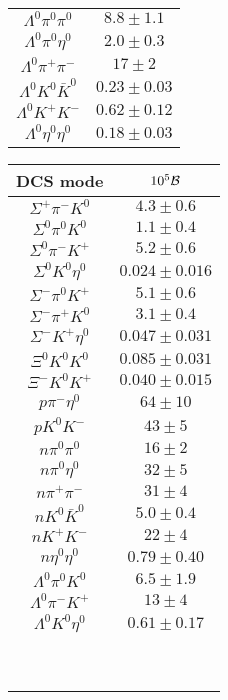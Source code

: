 \begin{table}
{\begin{tabular}{|c|c|}
		$\Lambda^{0} \pi^{0} \pi^{0} $ & $    8.8\pm    1.1 $ \\
		$\Lambda^{0} \pi^{0} \eta^{0} $ & $    2.0 \pm     0.3 $ \\
		$\Lambda^{0} \pi^{+} \pi^{-} $ & $   17 \pm    2 $ \\
		$\Lambda^{0} K^{0} \bar{K}^{0} $ & $     0.23 \pm     0.03 $ \\
		$\Lambda^{0} K^{+} K^{-} $ & $     0.62 \pm     0.12 $ \\
		$\Lambda^{0} \eta^{0} \eta^{0} $ & $     0.18 \pm     0.03 $ \\
		\hline
	\end{tabular}
	\begin{tabular}{|c|c|}
		\hline
		DCS mode& $10^{5}{\cal B}$\\
		\hline
		$\Sigma^{+} \pi^{-} K^{0} $ & $    4.3 \pm     0.6 $ \\
		$\Sigma^{0} \pi^{0} K^{0} $ & $    1.1 \pm     0.4 $ \\
		$\Sigma^{0} \pi^{-} K^{+} $ & $    5.2 \pm     0.6 $ \\
		$\Sigma^{0} K^{0} \eta^{0} $ & $     0.024\pm     0.016 $ \\
		$\Sigma^{-} \pi^{0} K^{+} $ & $    5.1 \pm     0.6 $ \\
		$\Sigma^{-} \pi^{+} K^{0} $ & $    3.1 \pm     0.4 $ \\
		$\Sigma^{-} K^{+} \eta^{0} $ & $     0.047 \pm     0.031 $ \\
		$\Xi^{0} K^{0} K^{0} $ & $     0.085 \pm    0.031 $ \\
		$\Xi^{-} K^{0} K^{+} $ & $     0.040 \pm     0.015 $ \\
		$p \pi^{-} \eta^{0} $ & $   64 \pm   10 $ \\
		$p K^{0} K^{-} $ & $   43 \pm    5 $ \\
		$n \pi^{0} \pi^{0} $ & $   16 \pm    2 $ \\
		$n \pi^{0} \eta^{0} $ & $   32 \pm    5 $ \\
		$n \pi^{+} \pi^{-} $ & $   31 \pm   4 $ \\
		$n K^{0} \bar{K}^{0} $ & $    5.0 \pm     0.4 $ \\
		$n K^{+} K^{-} $ & $   22 \pm    4 $ \\
		$n \eta^{0} \eta^{0} $ & $     0.79 \pm     0.40 $ \\
		$\Lambda^{0} \pi^{0} K^{0} $ & $    6.5 \pm    1.9 $ \\
		$\Lambda^{0} \pi^{-} K^{+} $ & $   13 \pm    4 $ \\
		$\Lambda^{0} K^{0} \eta^{0} $ & $     0.61 \pm     0.17 $ \\
		&\\
		&\\
		&\\
		&\\
		&\\
		&\\
		&\\
		&\\
		&\\
		\hline
	\end{tabular}
}
\end{table}
